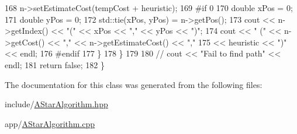 \begin{DoxyCode}
168             n->setEstimateCost(tempCost + heuristic);
169 \textcolor{preprocessor}{#if 0}
170 \textcolor{preprocessor}{}            \textcolor{keywordtype}{double} xPos = 0;
171             \textcolor{keywordtype}{double} yPos = 0;
172             std::tie(xPos, yPos) = n->getPos();
173             cout << n->getIndex() << \textcolor{stringliteral}{"("} << xPos << \textcolor{stringliteral}{","} << yPos << \textcolor{stringliteral}{")"};
174             cout << \textcolor{stringliteral}{" ("} << n->getCost() << \textcolor{stringliteral}{","} << n->getEstimateCost() << \textcolor{stringliteral}{","}
175                  << heuristic << \textcolor{stringliteral}{")"} << endl;
176 \textcolor{preprocessor}{#endif}
177 \textcolor{preprocessor}{}        \}
178     \}
179 
180     \textcolor{comment}{// cout << "Fail to find path" << endl;}
181     \textcolor{keywordflow}{return} \textcolor{keyword}{false};
182 \}
\end{DoxyCode}


The documentation for this class was generated from the following files\-:\begin{DoxyCompactItemize}
\item 
include/\hyperlink{AStarAlgorithm_8hpp}{A\-Star\-Algorithm.\-hpp}\item 
app/\hyperlink{AStarAlgorithm_8cpp}{A\-Star\-Algorithm.\-cpp}\end{DoxyCompactItemize}

